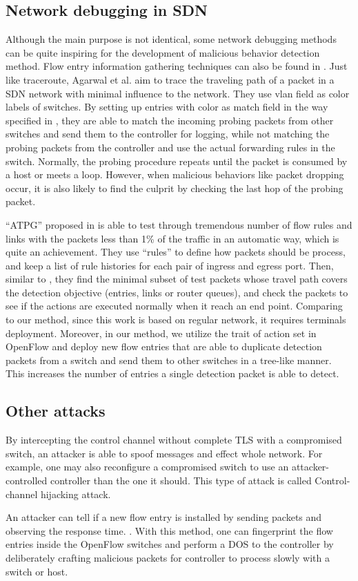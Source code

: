 \subsection{Network debugging in SDN}
Although the main purpose is not identical, some network debugging methods can be quite inspiring for the development of malicious behavior detection method. Flow entry information gathering techniques can also be found in \cite{ARDC14}. Just like traceroute, Agarwal et al. aim to trace the traveling path of a packet in a SDN network with minimal influence to the network. They use vlan field as color labels of switches. By setting up entries with color as match field in the way specified in \cite{ARDC14}, they are able to match the incoming probing packets from other switches and send them to the controller for logging, while not matching the probing packets from the controller and use the actual forwarding rules in the switch. Normally, the probing procedure repeats until the packet is consumed by a host or meets a loop. However, when malicious behaviors like packet dropping occur, it is also likely to find the culprit by checking the last hop of the probing packet.

``ATPG'' proposed in \cite{ZKVM12} is able to test through tremendous number of flow rules and links with the packets less than 1\% of the traffic in an automatic way, which is quite an achievement. They use ``rules'' to define how packets should be process, and keep a list of rule histories for each pair of ingress and egress port. Then, similar to \cite{PJL16}, they find the minimal subset of test packets whose travel path covers the detection objective (entries, links or router queues), and check the packets to see if the actions are executed normally when it reach an end point. Comparing to our method, since this work is based on regular network, it requires terminals deployment. Moreover, in our method, we utilize the trait of action set in OpenFlow and deploy new flow entries that are able to duplicate detection packets from a switch and send them to other switches in a tree-like manner. This increases the number of entries a single detection packet is able to detect. 

\subsection{Other attacks}
By intercepting the control channel without complete TLS with a compromised switch, an attacker is able to spoof messages and effect whole network. For example, one may also reconfigure a compromised switch to use an attacker-controlled controller than the one it should. This type of attack is called Control-channel hijacking attack.

An attacker can tell if a new flow entry is installed by sending packets and observing the response time. \cite{BCKK15}. With this method, one can fingerprint the flow entries inside the OpenFlow switches and perform a DOS to the controller by deliberately crafting malicious packets for controller to process slowly with a switch or host\cite{AAS14}.
